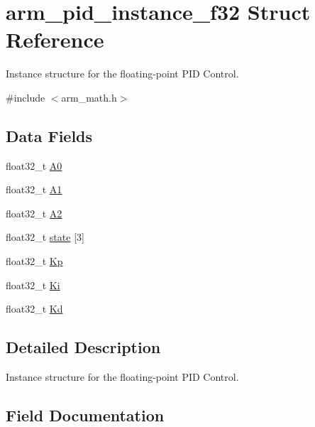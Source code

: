 \hypertarget{structarm__pid__instance__f32}{}\section{arm\+\_\+pid\+\_\+instance\+\_\+f32 Struct Reference}
\label{structarm__pid__instance__f32}


Instance structure for the floating-\/point P\+ID Control.  




{\ttfamily \#include $<$arm\+\_\+math.\+h$>$}

\subsection*{Data Fields}
\begin{DoxyCompactItemize}
\item 
float32\+\_\+t \hyperlink{structarm__pid__instance__f32_afc2ed2bf70b7d9d84f49ee9ae7caa004}{A0}
\item 
float32\+\_\+t \hyperlink{structarm__pid__instance__f32_a5e6785a3a5cf7b98f3bfc7b180d98273}{A1}
\item 
float32\+\_\+t \hyperlink{structarm__pid__instance__f32_a5b00947275caf079f351271bf41573fe}{A2}
\item 
float32\+\_\+t \hyperlink{structarm__pid__instance__f32_a473556ac6100fc188e77930d56f51062}{state} \mbox{[}3\mbox{]}
\item 
float32\+\_\+t \hyperlink{structarm__pid__instance__f32_abe23f3e122ef5f55398fcf77c793c425}{Kp}
\item 
float32\+\_\+t \hyperlink{structarm__pid__instance__f32_ad1a1aa1c10a2dca201a3422f82198777}{Ki}
\item 
float32\+\_\+t \hyperlink{structarm__pid__instance__f32_ace6b9e405a991cbaf6b4c137ca0d51a3}{Kd}
\end{DoxyCompactItemize}


\subsection{Detailed Description}
Instance structure for the floating-\/point P\+ID Control. 

\subsection{Field Documentation}
\mbox{\label{structarm__pid__instance__f32_afc2ed2bf70b7d9d84f49ee9ae7caa004}} 
